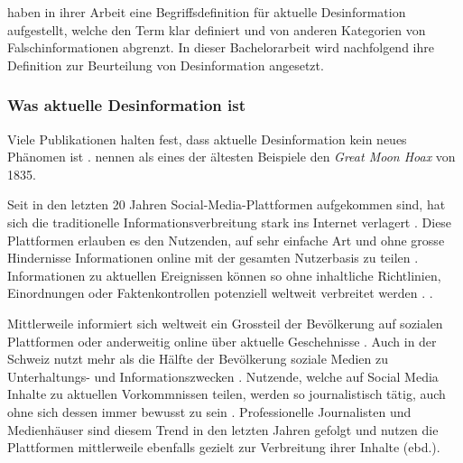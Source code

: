 \documentclass[12pt,a4paper]{article}        %
\begin{document}
\citeauthor{marx_fake_2020} haben in ihrer Arbeit eine Begriffsdefinition für aktuelle Desinformation aufgestellt, welche den Term klar definiert und von anderen Kategorien von Falschinformationen abgrenzt. In dieser Bachelorarbeit wird nachfolgend ihre Definition zur Beurteilung von Desinformation angesetzt.
\subsubsection{Was aktuelle Desinformation ist}
Viele Publikationen halten fest, dass aktuelle Desinformation kein neues Phänomen ist \parencites[vgl.\ bspw.][2]{tandoc_jr_facts_2019}[214]{allcott_social_2017}[1094]{lazer_science_2018}. \textcite[214]{allcott_social_2017} nennen als eines der ältesten Beispiele den \textit{Great Moon Hoax} von 1835.

Seit in den letzten 20 Jahren Social-Media-Plattformen aufgekommen sind, hat sich die traditionelle Informationsverbreitung stark ins Internet verlagert \parencites[211]{allcott_social_2017}[147]{marx_fake_2020}[138]{tandoc_jr_defining_2018}[1094]{lazer_science_2018}. Diese Plattformen erlauben es den Nutzenden, auf sehr einfache Art und ohne grosse Hindernisse Informationen online mit der gesamten Nutzerbasis zu teilen \parencites[1]{vogler_wahrnehmung_2021}{lazer_science_2018}. Informationen zu aktuellen Ereignissen können so ohne inhaltliche Richtlinien, Einordnungen oder Faktenkontrollen potenziell weltweit verbreitet werden \parencites[147]{marx_fake_2020}[211]{allcott_social_2017}[4]{ceron_fake_2021}[165f]{wahl_fake_2021}.  \parencite[211]{allcott_social_2017}.

Mittlerweile informiert sich weltweit ein Grossteil der Bevölkerung auf sozialen Plattformen oder anderweitig online über aktuelle Geschehnisse \parencite[212]{allcott_social_2017}. Auch in der Schweiz nutzt mehr als die Hälfte der Bevölkerung soziale Medien zu Unterhaltungs- und Informationszwecken \parencite[21ff]{we_are_social_anteil_2024}. Nutzende, welche auf Social Media Inhalte zu aktuellen Vorkommnissen teilen, werden so journalistisch tätig, auch ohne sich dessen immer bewusst zu sein \parencite[139]{tandoc_jr_defining_2018}. Professionelle Journalisten und Medienhäuser sind diesem Trend in den letzten Jahren gefolgt und nutzen die Plattformen mittlerweile ebenfalls gezielt zur Verbreitung ihrer Inhalte (ebd.).
\end{document}
